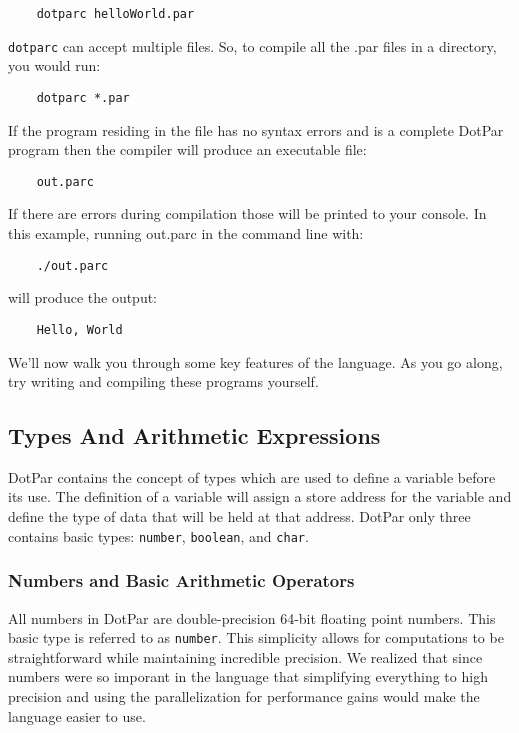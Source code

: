\begin{verbatim}
    dotparc helloWorld.par
\end{verbatim}

\verb=dotparc= can accept multiple files. So, to compile all the .par files in a
directory, you would run: 

\begin{verbatim}
    dotparc *.par
\end{verbatim}

If the program residing in the file has no syntax errors and is a complete
DotPar program then the compiler will produce an executable file:

\begin{verbatim}
    out.parc
\end{verbatim}

If there are errors during compilation those will be printed to your console. In
this example, running out.parc in the command line with:

\begin{verbatim}
    ./out.parc
\end{verbatim}

will produce the output:

\begin{verbatim}
    Hello, World
\end{verbatim}

We'll now walk you through some key features of the language. As you go along,
try writing and compiling these programs yourself.

\subsection{Types And Arithmetic Expressions}

DotPar contains the concept of types which are used to define a variable before
its use.  The definition of a variable will assign a store address for the
variable and define the type of data that will be held at that address.  DotPar
only three contains basic types: \verb=number=, \verb=boolean=, and \verb=char=.

\subsubsection{Numbers and Basic Arithmetic Operators}
All numbers in DotPar are double-precision 64-bit floating point numbers.  This
basic type is referred to as \verb=number=.  This simplicity allows for
computations to be straightforward while maintaining incredible precision. We
realized that since numbers were so imporant in the language that simplifying
everything to high precision and using the parallelization for performance gains
would make the language easier to use.

